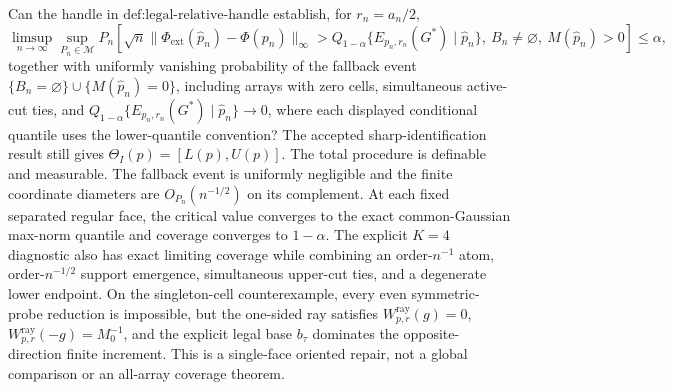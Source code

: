 Can the handle in \(\text{def:legal-relative-handle}\) establish, for \(r_n=a_n/2\),
\[
\limsup_{n\to\infty}\sup_{P_n\in\mathcal M}P_n\!\left[\sqrt n\|\Phi_{\mathrm{ext}}(\widehat p_n)-\Phi(p_n)\|_\infty>Q_{1-\alpha}\{E_{p_n,r_n}(G^*)\mid\widehat p_n\},\ B_n\ne\varnothing,\ M(\widehat p_n)>0\right]\le\alpha,
\]
together with uniformly vanishing probability of the fallback event \(\{B_n=\varnothing\}\cup\{M(\widehat p_n)=0\}\), including arrays with zero cells, simultaneous active-cut ties, and \(Q_{1-\alpha}\{E_{p_n,r_n}(G^*)\mid\widehat p_n\}\to0\), where each displayed conditional quantile uses the lower-quantile convention?
The accepted sharp-identification result still gives \(\Theta_I(p)=[L(p),U(p)]\).  The total procedure is definable and measurable.  The fallback event is uniformly negligible and the finite coordinate diameters are \(O_{P_n}(n^{-1/2})\) on its complement.  At each fixed separated regular face, the critical value converges to the exact common-Gaussian max-norm quantile and coverage converges to \(1-\alpha\).  The explicit \(K=4\) diagnostic also has exact limiting coverage while combining an order-\(n^{-1}\) atom, order-\(n^{-1/2}\) support emergence, simultaneous upper-cut ties, and a degenerate lower endpoint.  On the singleton-cell counterexample, every even symmetric-probe reduction is impossible, but the one-sided ray satisfies \(W^{\mathrm{ray}}_{p,r}(g)=0\), \(W^{\mathrm{ray}}_{p,r}(-g)=M_0^{-1}\), and the explicit legal base \(b_\tau\) dominates the opposite-direction finite increment.  This is a single-face oriented repair, not a global comparison or an all-array coverage theorem.
